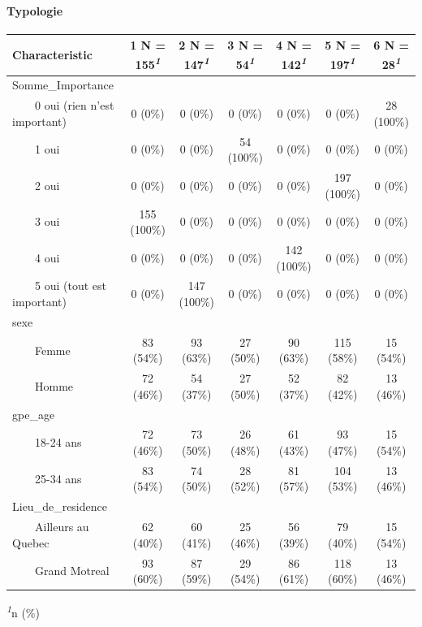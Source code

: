 \documentclass[
]{article}
\begin{document}
\hypertarget{typologie}{%
\paragraph{Typologie}\label{typologie}}

\begin{table}[!t]
\fontsize{12.0pt}{14.4pt}\selectfont
\begin{tabular*}{\linewidth}{@{\extracolsep{\fill}}lcccccc}
\toprule
\textbf{Characteristic} & \textbf{1}  N = 155\textsuperscript{\textit{1}} & \textbf{2}  N = 147\textsuperscript{\textit{1}} & \textbf{3}  N = 54\textsuperscript{\textit{1}} & \textbf{4}  N = 142\textsuperscript{\textit{1}} & \textbf{5}  N = 197\textsuperscript{\textit{1}} & \textbf{6}  N = 28\textsuperscript{\textit{1}} \\ 
\midrule\addlinespace[2.5pt]
Somme\_Importance &  &  &  &  &  &  \\ 
    0 oui (rien n’est important) & 0 (0\%) & 0 (0\%) & 0 (0\%) & 0 (0\%) & 0 (0\%) & 28 (100\%) \\ 
    1 oui & 0 (0\%) & 0 (0\%) & 54 (100\%) & 0 (0\%) & 0 (0\%) & 0 (0\%) \\ 
    2 oui & 0 (0\%) & 0 (0\%) & 0 (0\%) & 0 (0\%) & 197 (100\%) & 0 (0\%) \\ 
    3 oui & 155 (100\%) & 0 (0\%) & 0 (0\%) & 0 (0\%) & 0 (0\%) & 0 (0\%) \\ 
    4 oui & 0 (0\%) & 0 (0\%) & 0 (0\%) & 142 (100\%) & 0 (0\%) & 0 (0\%) \\ 
    5 oui (tout est important) & 0 (0\%) & 147 (100\%) & 0 (0\%) & 0 (0\%) & 0 (0\%) & 0 (0\%) \\ 
sexe &  &  &  &  &  &  \\ 
    Femme & 83 (54\%) & 93 (63\%) & 27 (50\%) & 90 (63\%) & 115 (58\%) & 15 (54\%) \\ 
    Homme & 72 (46\%) & 54 (37\%) & 27 (50\%) & 52 (37\%) & 82 (42\%) & 13 (46\%) \\ 
gpe\_age &  &  &  &  &  &  \\ 
    18-24 ans & 72 (46\%) & 73 (50\%) & 26 (48\%) & 61 (43\%) & 93 (47\%) & 15 (54\%) \\ 
    25-34 ans & 83 (54\%) & 74 (50\%) & 28 (52\%) & 81 (57\%) & 104 (53\%) & 13 (46\%) \\ 
Lieu\_de\_residence &  &  &  &  &  &  \\ 
    Ailleurs au Quebec & 62 (40\%) & 60 (41\%) & 25 (46\%) & 56 (39\%) & 79 (40\%) & 15 (54\%) \\ 
    Grand Motreal & 93 (60\%) & 87 (59\%) & 29 (54\%) & 86 (61\%) & 118 (60\%) & 13 (46\%) \\ 
\bottomrule
\end{tabular*}
\begin{minipage}{\linewidth}
\textsuperscript{\textit{1}}n (\%)\\
\end{minipage}
\end{table}
\end{document}
